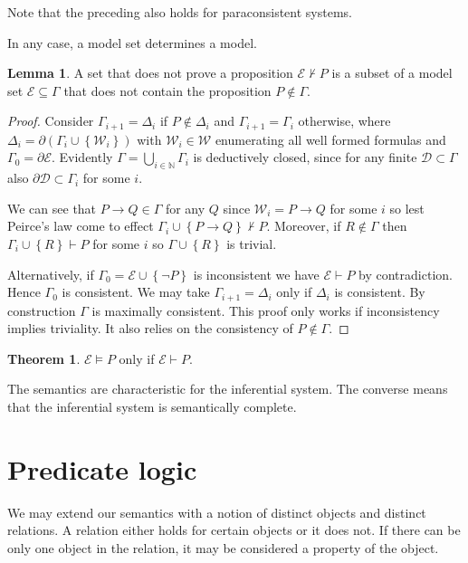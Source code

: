\documentclass{amsbook}
\newcommand{\setsm}[1]{\left\{#1\right\}}
\newcommand{\wffs}{\mathcal W}
\newcommand{\infers}{\mathrel\vdash}
\newcommand{\valids}{\mathrel\vDash}
\newcommand{\then}{\mathrel\rightarrow}
\theoremstyle{definition}
\newtheorem{thm}{Theorem}[section]
\newtheorem{lmm}{Lemma}[section]
\begin{document}
Note that the preceding also holds for paraconsistent systems.

In any case, a model set determines a model.

\begin{lmm}
    A set that does not prove a proposition $\mathcal E \nvdash P$ is a subset of a model set $\mathcal E \subseteq \Gamma$ that does not contain the proposition $P \notin \Gamma$.
    \begin{proof}
        Consider $\Gamma_{i+1} = \Delta_i$ if $P \notin \Delta_i$ and $\Gamma_{i+1} = \Gamma_i$ otherwise, where $\Delta_i = \partial(\Gamma_i \cup \setsm {\wffs_i})$ with $\wffs_i \in \wffs$ enumerating all well formed formulas and $\Gamma_0 = \partial\mathcal E$.
        Evidently $\Gamma = \bigcup_{i \in \mathbb N} \Gamma_i$ is deductively closed, since for any finite $\mathcal D \subset \Gamma$ also $\partial\mathcal D \subset \Gamma_i$ for some $i$.

        We can see that $P \then Q \in \Gamma$ for any $Q$ since $\wffs_i = P \then Q$ for some $i$ so lest Peirce's law come to effect $\Gamma_i \cup \setsm{P \then Q} \nvdash P$. Moreover, if $R \notin \Gamma$ then $\Gamma_i \cup \setsm R \infers P$ for some $i$ so $\Gamma \cup \setsm R$ is trivial.

        Alternatively, if $\Gamma_0 = \mathcal E \cup \setsm {\neg P}$ is inconsistent we have $\mathcal E \infers P$ by contradiction. Hence $\Gamma_0$ is consistent. We may take $\Gamma_{i+1} = \Delta_i$ only if $\Delta_i$ is consistent. By construction $\Gamma$ is maximally consistent. This proof only works if inconsistency implies triviality. It also relies on the consistency of $P \notin \Gamma$.
    \end{proof}
\end{lmm}

\begin{thm}
    $\mathcal E \valids P$ only if $\mathcal E \infers P$.

    The semantics are characteristic for the inferential system. The converse means that the inferential system is semantically complete.
\end{thm}

\chapter{Predicate logic}

We may extend our semantics with a notion of distinct objects and distinct relations. A relation either holds for certain objects or it does not. If there can be only one object in the relation, it may be considered a property of the object.
\end{document}
